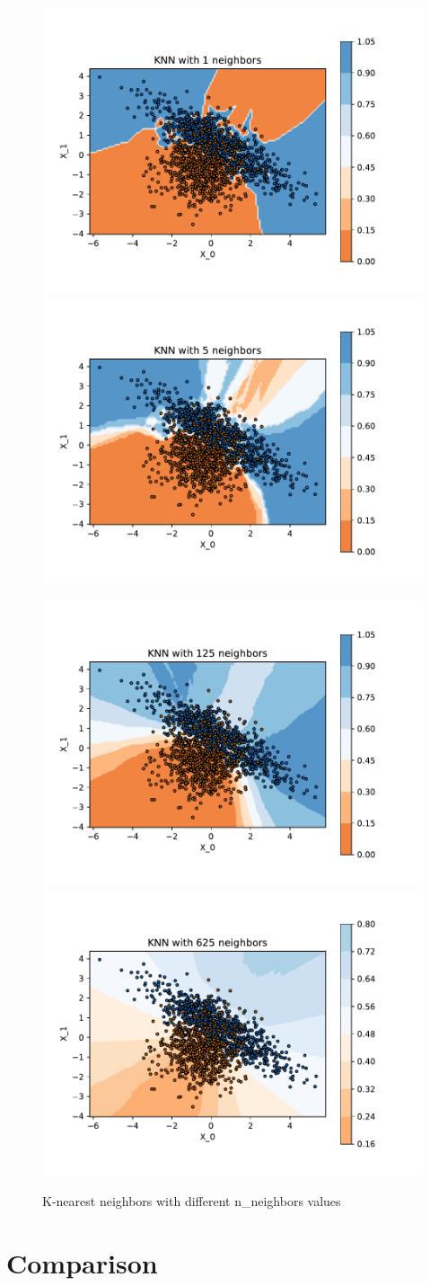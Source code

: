 \documentclass[12pt]{article}
\begin{document}
\subsection{}
\begin{figure}[htp]
	\centering
	\includegraphics[width=.4\textwidth]{img/knn_1.pdf}\quad
	\includegraphics[width=.4\textwidth]{img/knn_5.pdf}\quad
	
	\medskip
	
	\includegraphics[width=.4\textwidth]{img/knn_125.pdf}\quad
	\includegraphics[width=.4\textwidth]{img/knn_625.pdf}\quad
	
	\caption{K-nearest neighbors with different n\_neighbors values}
	\label{fig:knn}
\end{figure}
\section{Comparison}
\end{document}
